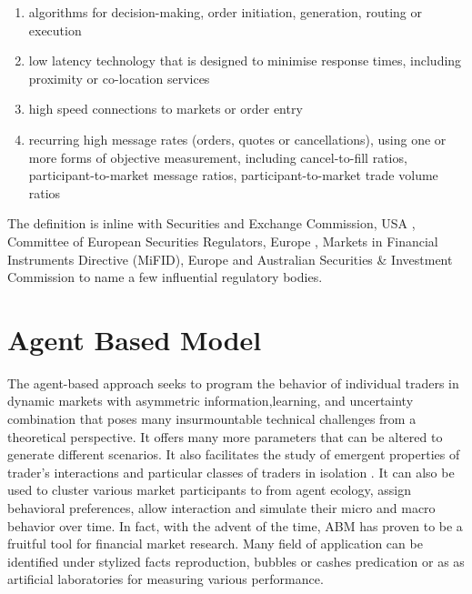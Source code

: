 \documentclass[12pt,a4paper]{article}
\numberwithin{equation}{section}
\numberwithin{figure}{section}
\numberwithin{table}{section}
\begin{document}
\begin{enumerate}

\item algorithms for decision-making, order initiation, generation, routing or execution
\item low latency technology that is designed to minimise response times, including proximity or co-location services
\item high speed connections to markets or order entry
\item recurring high message rates (orders, quotes or cancellations), using one or more forms of objective measurement, including cancel-to-fill ratios, participant-to-market message ratios, participant-to-market trade volume ratios

\end{enumerate}

The definition is inline with Securities and Exchange Commission, USA \citet{SEC2010}, Committee of European Securities Regulators, Europe \citet{CESR2010}, Markets in Financial Instruments Directive (MiFID), Europe \citet{mifid2010} and Australian Securities \& Investment Commission \citet{ASIC2010} to name a few influential regulatory bodies.

\section{Agent Based Model}\label{sec:abm}
The agent-based approach seeks to program the behavior of individual traders in dynamic markets with asymmetric information,learning, and uncertainty combination that poses many insurmountable technical challenges from a theoretical perspective. It offers many more parameters that can be altered to generate different scenarios. It also facilitates the study of emergent properties of trader's interactions and particular classes of traders in isolation \citep{farmer2009}. It can also be used to cluster various market participants to from agent ecology, assign behavioral preferences, allow interaction and simulate their micro and macro behavior over time. In fact, with the advent of the time, ABM has proven to be a fruitful tool for financial market research. Many field of application can be identified under stylized facts reproduction, bubbles or cashes predication or as as artificial laboratories for measuring various performance.
\end{document}
